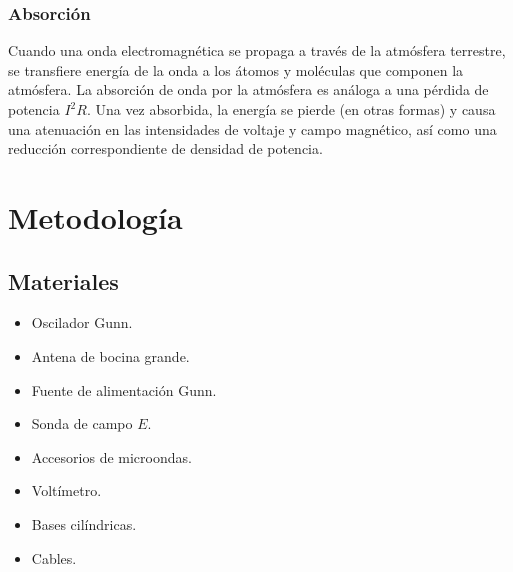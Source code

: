 \documentclass[spanish,notitlepage,letterpaper, 12pt]{article}
\begin{document}
\subsubsection{Absorción}
Cuando una onda electromagnética se propaga a través de la atmósfera terrestre, se
transfiere energía de la onda a los átomos y moléculas que componen la atmósfera. La
absorción de onda por la atmósfera es análoga a una pérdida de potencia $I^2R$. Una vez
absorbida, la energía se pierde (en otras formas) y causa una atenuación en las
intensidades de voltaje y campo magnético, así como una reducción correspondiente de
densidad de potencia.
\section{Metodología}
\subsection{Materiales}
\begin{itemize}
    \item Oscilador Gunn.
    \item Antena de bocina grande.
    \item Fuente de alimentación Gunn.
    \item Sonda de campo $E$.
    \item Accesorios de microondas.
    \item Voltímetro.
    \item Bases cilíndricas.
    \item Cables.
\end{itemize}
\end{document}
